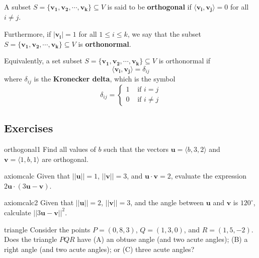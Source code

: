 \begin{definition}
    A subset $S = \{\bm{v_1}, \bm{v_2}, \cdots, \bm{v_k}\} \subseteq V$ is said to be \textbf{orthogonal} if $\langle \bm{v_i}, \bm{v_j} \rangle = 0$ for all $i \neq j$.
    
    \vspace{1em}
    
    Furthermore, if $|\bm{v_i}| = 1$ for all $1 \leq i \leq k$, we say that the subset $S = \{\bm{v_1}, \bm{v_2}, \cdots, \bm{v_k}\} \subseteq V$ is \textbf{orthonormal}.
\end{definition}
    
    \begin{proposition}
        Equivalently, a set subset $S = \{\bm{v_1}, \bm{v_2}, \cdots, \bm{v_k}\} \subseteq V$ is orthonormal if $$\langle \bm{v_i}, \bm{v_j} \rangle = \delta_{ij}$$ 
        where $\delta_{ij}$ is the \textbf{Kronecker delta}, which is the symbol $$\delta_{ij} = \left\{
		\begin{array}{ll}
			1 & \text{ if } i = j \\
			0 & \text{ if } i \neq j
		\end{array}
		\right.$$
    \end{proposition}


\subsection{Exercises}

\begin{problem}{orthogonal1}
     Find all values of $b$ such that the vectors $\bm{u} = \langle b,3,2\rangle$ and $\bm{v} = \langle 1,b,1\rangle$ are orthogonal.
\end{problem}

\begin{problem}{axiomcalc}
    Given that $||\bm{u}|| = 1$, $||\bm{v}|| = 3$, and $\bm{u} \cdot \bm{v} = 2$, evaluate the expression $2\bm{u} \cdot (3\bm{u} - \bm{v})$.
\end{problem}

\begin{problem}{axiomcalc2}
    Given that $||\bm{u}|| = 2$, $||\bm{v}|| = 3$, and the angle between $\bm{u}$ and $\bm{v}$ is $120^\circ$, calculate $||3\bm{u}-\bm{v}||^2$.
\end{problem}

\begin{problem}{triangle}
    Consider the points $P= (0,8,3)$, $Q= (1,3,0)$, and $R= (1,5,-2)$.   Does the triangle $PQR$ have (A) an obtuse angle (and two acute angles); (B) a right angle (and two acute angles); or (C) three acute angles?
\end{problem}

